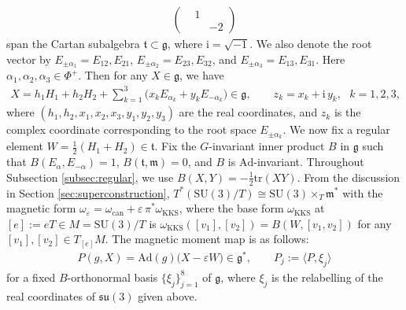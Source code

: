 \documentclass[11pt]{amsart}
\theoremstyle{definition}
\theoremstyle{plain}
\theoremstyle{conclusion}
\begin{document}
\begin{align*}
\begin{pmatrix}
&1& \\
& &-2
\end{pmatrix}
\end{align*} span the Cartan subalgebra $\mathfrak{t} \subset \mathfrak{g}$, where $\mathrm{i} = \sqrt{-1}$. We also denote the root vector by $E_{\pm\alpha_1} = E_{12},E_{21}$, $E_{\pm\alpha_2}= E_{23},E_{32}$, and $E_{\pm\alpha_3} = E_{13},E_{31}$. Here $\alpha_1,\alpha_2,\alpha_3 \in \Phi^+$. Then for any $X \in \mathfrak{g}$, we have \begin{align*}
X= h_1 H_1+ h_2H_2 + \sum_{k = 1}^3\bigl(x_kE_{\alpha_k} + y_kE_{-\alpha_k}\bigr) \in\mathfrak{g}, \qquad  z_k = x_k + \mathrm{i}\,y_k  , \text{ } k=1,2,3,
\end{align*} where $(h_1, h_2,x_1,x_2, x_3, y_1, y_2, y_3)$ are the real coordinates, and $z_k$ is the complex coordinate corresponding to the root space $E_{\pm \alpha_k}$.  We now fix a regular element $W=\frac{1}{2}(H_1 + H_2) \in \mathfrak{t}$. Fix the $G$-invariant inner product $B$ in $\mathfrak{g}$ such that  $B(E_{\alpha},E_{-\alpha}) =1$, $B(\mathfrak{t},\mathfrak{m})=0$, and $B$ is $\mathrm{Ad}$-invariant. Throughout Subsection \ref{subsec:regular}, we use $B(X,Y)=-\frac{1}{2}\mathrm{tr}(XY)$. 
 From the discussion in Section \ref{sec:superconstruction},  $ T^*(\mathrm{SU}(3)/T)\cong \mathrm{SU}(3)\times_T\mathfrak{m}^*$  with the magnetic form $\omega_\varepsilon=\omega_{\mathrm{can}}+\varepsilon\,\pi^*\omega_{\mathrm{KKS}}$, where the base form $\omega_{\mathrm{KKS}}$ at $[e] := eT\in M=\mathrm{SU}(3)/T $ is $\omega_{\mathrm{KKS}}([v_1],[v_2])=B(W,[v_1,v_2])$ for any $[v_1],[v_2] \in T_{[e]}M$.
The magnetic moment map is as follows:  \begin{align*}
P(g,X)=\mathrm{Ad}(g)\bigl(X-\varepsilon W\bigr)\in\mathfrak{g}^*,\qquad P_j:=\langle P,\xi_j\rangle
\end{align*} for a fixed $B$-orthonormal basis $\{\xi_j\}_{j=1}^8$ of $\mathfrak{g}$, where $\xi_j$ is the relabelling of the real coordinates of $\mathfrak{su}(3)$ given above. 
\end{document}
